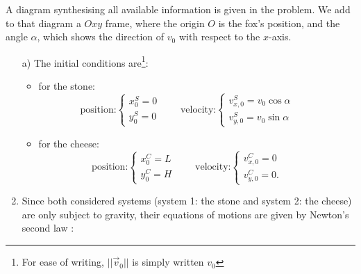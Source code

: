 %
%

\begin{center}
\vspace*{5mm}
\end{center}
A diagram synthesising all available information is given in the problem. We add to that diagram a $Oxy$ frame, where the origin $O$ is the fox's position, and the angle $\alpha$, which shows the direction of $v_0$ with respect to the $x$-axis.
\begin{center}

\end{center}
\begin{enumerate}
\item[a)] The initial conditions are\footnote{For ease of writing, $||\vec{v}_0||$ is simply written $v_0$}:\\
\begin{itemize}
\item for the stone: \\
\begin{displaymath}
\textrm{position:}
\left\{ \begin{array}{l}
x_0^S = 0 \\
y_0^S = 0
\end{array}\right.\qquad
\textrm{velocity:}
\left\{ \begin{array}{l}
v_{x,0}^S = v_0\cos\alpha\\
v_{y,0}^S = v_0\sin\alpha
\end{array}\right.\qquad
\end{displaymath}
\item for the cheese: \\
\begin{displaymath}
\textrm{position:}
\left\{ \begin{array}{l}
x_0^C = L \\
y_0^C = H
\end{array}\right.\qquad
\textrm{velocity:}
\left\{ \begin{array}{l}
v_{x,0}^C = 0\\
v_{y,0}^C = 0.
\end{array}\right.\qquad
\end{displaymath}
\end{itemize}
\item Since both considered systems (system 1: the stone and system 2: the cheese) are only subject to gravity, their equations of motions are given by Newton's second law : 

\end{enumerate}
